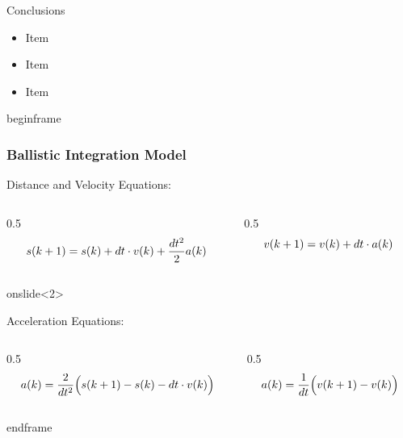 \begin{frame}{Conclusions}

\begin{itemize}
\item Item
\vfill \item  Item
\vfill \item  Item
\end{itemize}

\end{frame}


begin{frame}
 \frametitle{Ballistic Integration Model }

   Distance and Velocity Equations:
   \begin{columns}[c]
       \begin{column}{0.5\hsize}\centering
       $$ \small s(k+1) = s(k) + dt \cdot v(k) + \frac{dt^2}{2} a(k) $$    
       \end{column}

       \begin{column}{0.5\hsize}
       $$ \small v(k+1) = v(k) + dt \cdot a(k) $$
       \end{column}
   \end{columns}

   \hfil

   \hfil

   \hfil

onslide<2>{

   Acceleration Equations:
   \begin{columns}[c]
       \begin{column}{0.5\hsize}
           \centering
           $$a(k) = \frac{2}{dt^2} \Bigl( s(k+1) - s(k) - dt \cdot v(k) \Bigr)$$
       \end{column}

       \begin{column}{0.5\hsize}
           \centering
           $$ a(k) = \frac{1}{dt} \Bigl( v(k+1) - v(k) \Bigr)$$
       \end{column}
   \end{columns}
}
end{frame}

